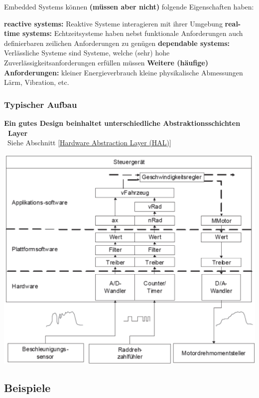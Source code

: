 Embedded Systems können \textbf{(müssen aber nicht)} folgende Eigenschaften haben:

\begin{outline}
    \1 \textbf{reactive systems:}  Reaktive Systeme interagieren mit ihrer Umgebung
    \1 \textbf{real-time systems:} Echtzeitsysteme haben nebst funktionale Anforderungen auch definierbaren zeilichen Anforderungen zu genügen
    \1 \textbf{dependable systems:} Verlässliche Systeme sind Systeme, welche (sehr) hohe Zuverlässigkeitsanforderungen erfüllen müssen
    \1 \textbf{Weitere (häufige) Anforderungen:} 
        \2 kleiner Energieverbrauch
        \2 kleine physikalische Abmessungen
        \2 Lärm, Vibration, etc.
\end{outline}


\subsubsection{Typischer Aufbau}

\textbf{Ein gutes Design beinhaltet unterschiedliche Abstraktionsschichten \textrightarrow\ Layer} \\
\textrightarrow\ Siehe Abschnitt \ref{Hardware Abstraction Layer (HAL)}

\begin{center}
    \includegraphics[width=0.8\columnwidth]{images/embedded_system_aufbau_schichten.png}
\end{center}


\subsection{Beispiele}

\vspace{-0.2cm}

